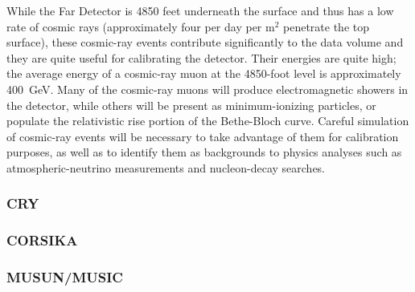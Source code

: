 While the Far Detector is 4850 feet underneath the surface and thus has a low rate of cosmic rays (approximately 
four per day per m$^2$ penetrate the top surface), these cosmic-ray events contribute significantly to the data
volume and they are quite useful for calibrating the detector.  Their energies are quite high; the average energy
of a cosmic-ray muon at the 4850-foot level is approximately 400~GeV.  Many of the cosmic-ray muons will produce
electromagnetic showers in the detector, while others will be present as minimum-ionizing particles, or populate
the relativistic rise portion of the Bethe-Bloch curve.  Careful simulation of cosmic-ray events will be necessary
to take advantage of them for calibration purposes, as well as to identify them as backgrounds to physics analyses
such as atmospheric-neutrino measurements and nucleon-decay searches.

\subsubsection{CRY}

\subsubsection{CORSIKA}

\subsubsection{MUSUN/MUSIC}  %

